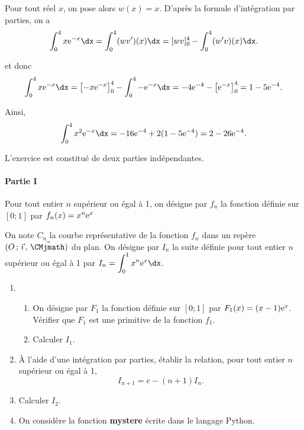 \documentclass[11pt,fleqn, openany]{book} %
\begin{document}
\begin{solution}
\begin{enumerate}
	Pour tout réel \(x\), on pose alors \(w(x) =x\). D'après la formule d'intégration par parties, on a
\[ \displaystyle \int _0^4 x\e^{-x}\dx = \displaystyle \int _0^4 (wv')(x)\dx = [wv]_0^4 - \displaystyle \int _0^4 (w'v)(x)\dx.\]

	et donc 
\[ \displaystyle \int _0^4 x\e^{-x}\dx = \left[-x\e^{-x}\right]_0^4 - \displaystyle \int _0^4 -\e^{-x}\dx = -4\e^{-4} - \left[\e^{-x}\right]_0^4 = 1-5\e^{-4}.\]

	Ainsi, 
\[ \displaystyle \int _0^4 x^2\e^{-x}\dx = -16\e^{-4}+2(1-5\e^{-4})=2-26\e^{-4}.\]
\end{enumerate}
\end{solution}







\begin{exercise}[topic=int04, subtitle={(Sujet zéro 2024)}]

L'exercice est constitué de deux parties indépendantes.

\paragraph{Partie I}

Pour tout entier $n$ supérieur ou égal à 1, on désigne par $f_n$ la fonction définie sur $[0;1]$ par $f_n(x)=x^n\mathrm{e}^x$

On note $C_n$ la courbe représentative de la fonction $f_n$ dans un repère $\Oij$ du plan. On désigne par $I_n$ la suite définie pour tout entier $n$ supérieur ou égal à 1 par $I_n=\displaystyle\int_0^1x^n\e^x\dx$.

\begin{enumerate}
\item \begin{enumerate} 
\item On désigne par $F_1$ la fonction définie sur $[0;1]$ par $F_1(x)=(x-1)\mathrm{e}^x$.\\ Vérifier que $F_1$ est une primitive de la fonction $f_1$.
\item Calculer $I_1$.
\end{enumerate}
\item À l'aide d'une intégration par parties, établir la relation, pour tout entier $n$ supérieur ou égal à 1, \[I_{n+1}=e-(n+1)I_n.\]
\item Calculer $I_2$.
\item On considère la fonction \textbf{mystere} écrite dans le langage Python.


\end{enumerate}
\end{exercise}
\end{document}
